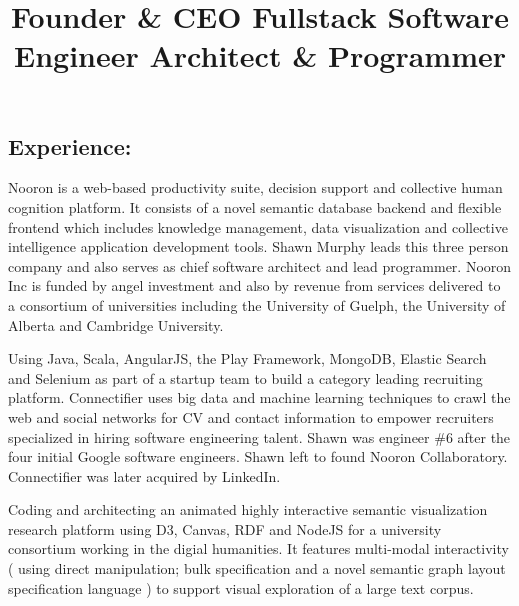 \documentclass[line,margin]{res}
\begin{document}
\begin{resume}
\pagebreak
\section{Experience:}


\title{ Founder \& CEO }
\begin{position}
Nooron is a web-based productivity suite, decision support and collective human cognition platform.
It consists of a novel semantic database backend and flexible frontend which includes knowledge
management, data visualization and collective intelligence application development tools.
Shawn Murphy leads this three person company and also serves as chief software architect and lead
programmer.
Nooron Inc is funded by angel investment and also by revenue from services delivered to
a consortium of universities including the University of Guelph, the University of Alberta
and Cambridge University.
\end{position}

\title{ Fullstack Software Engineer }
\begin{position}
Using Java, Scala, AngularJS, the Play Framework, MongoDB, Elastic Search and Selenium
as part of a startup team to build a category leading recruiting platform.
Connectifier uses big data and machine learning techniques to crawl the web and social
networks for CV and contact information to empower recruiters specialized in hiring
software engineering talent.
Shawn was engineer \#6 after the four initial Google software engineers.
Shawn left to found Nooron Collaboratory.
Connectifier was later acquired by LinkedIn.
\end{position}

\title{ Architect \& Programmer }
\begin{position}
Coding and architecting an animated highly interactive semantic visualization research platform using
D3, Canvas, RDF and NodeJS for a university consortium working in the digial humanities.
It features multi-modal interactivity ( using direct manipulation; bulk specification
and a novel semantic graph layout specification language ) to support visual exploration of a
large text corpus.
\end{position}


\end{resume}
\end{document}
